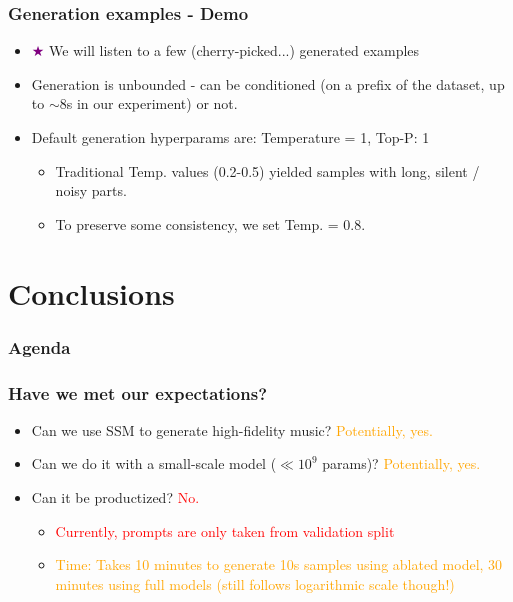 \documentclass{beamer}
\begin{document}
\begin{frame}
    \frametitle{Generation examples - Demo}
    \begin{itemize}
        \item \textcolor{purple}{$\bigstar $} We will listen to a few (cherry-picked...) generated examples
        \item Generation is unbounded - can be conditioned (on a prefix of the dataset, up to $\sim$8s in our experiment) or not.
        \item Default generation hyperparams are: Temperature = 1, Top-P: 1
        \begin{itemize}
            \item Traditional Temp. values (0.2-0.5) yielded samples with long, silent / noisy parts.
            \item To preserve some consistency, we set Temp. = 0.8.
        \end{itemize}
    \end{itemize}
\end{frame}


\section{Conclusions}
\begin{frame}
    \frametitle{Agenda}
    \tableofcontents[currentsection]
\end{frame}

\begin{frame}
    \frametitle{Have we met our expectations?}
    \begin{itemize}
        \item Can we use SSM to generate high-fidelity music? \textcolor{orange}{Potentially, yes.}
        \item Can we do it with a small-scale model ($\ll 10^9$ params)? \textcolor{orange}{Potentially, yes.}
        \item Can it be productized? \textcolor{red}{No.}
        \begin{itemize}
            \item \textcolor{red}{Currently, prompts are only taken from validation split}
            \item \textcolor{orange}{Time: Takes 10 minutes to generate 10s samples using ablated model, 30 minutes using full models (still follows logarithmic scale though!)}
        \end{itemize}
    \end{itemize}
\end{frame}
\end{document}
